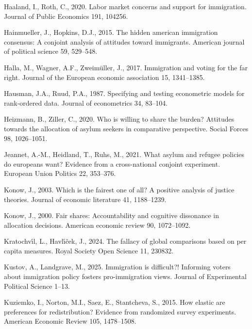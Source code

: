 \documentclass[
  12pt,
  a4paper,
]{article}
\newlength{\cslhangindent}
\newenvironment{CSLReferences}[2] %
 {\begin{list}{}{%
  \setlength{\itemindent}{0pt}
  \setlength{\leftmargin}{0pt}
  \setlength{\parsep}{0pt}
  \ifodd #1
   \setlength{\leftmargin}{\cslhangindent}
   \setlength{\itemindent}{-1\cslhangindent}
  \fi
  \setlength{\itemsep}{#2\baselineskip}}}
 {\end{list}}
\begin{document}
\begin{CSLReferences}{1}{0}
Haaland, I., Roth, C., 2020. Labor market concerns and support for immigration. Journal of Public Economics 191, 104256.

Hainmueller, J., Hopkins, D.J., 2015. The hidden american immigration consensus: A conjoint analysis of attitudes toward immigrants. American journal of political science 59, 529--548.

Halla, M., Wagner, A.F., Zweimüller, J., 2017. Immigration and voting for the far right. Journal of the European economic association 15, 1341--1385.

Hausman, J.A., Ruud, P.A., 1987. Specifying and testing econometric models for rank-ordered data. Journal of econometrics 34, 83--104.

Heizmann, B., Ziller, C., 2020. Who is willing to share the burden? Attitudes towards the allocation of asylum seekers in comparative perspective. Social Forces 98, 1026--1051.

Jeannet, A.-M., Heidland, T., Ruhs, M., 2021. What asylum and refugee policies do europeans want? Evidence from a cross-national conjoint experiment. European Union Politics 22, 353--376.

Konow, J., 2003. Which is the fairest one of all? A positive analysis of justice theories. Journal of economic literature 41, 1188--1239.

Konow, J., 2000. Fair shares: Accountability and cognitive dissonance in allocation decisions. American economic review 90, 1072--1092.

Kratochvı́l, L., Havlı́ček, J., 2024. The fallacy of global comparisons based on per capita measures. Royal Society Open Science 11, 230832.

Kustov, A., Landgrave, M., 2025. Immigration is difficult?! Informing voters about immigration policy fosters pro-immigration views. Journal of Experimental Political Science 1--13.

Kuziemko, I., Norton, M.I., Saez, E., Stantcheva, S., 2015. How elastic are preferences for redistribution? Evidence from randomized survey experiments. American Economic Review 105, 1478--1508.


\end{CSLReferences}
\end{document}
